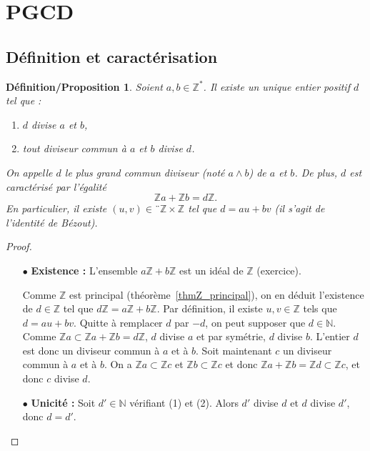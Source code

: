 \documentclass[10pt,a4paper]{report}
\newtheorem{Def/prop}[thm]{Définition/Proposition}
\newcommand{\N}{\mathbb{N}}
\newcommand{\Z}{\mathbb{Z}}
\begin{document}
\section{PGCD}

\subsection{Définition et caractérisation}

\begin{Def/prop}\label{def_prop_PGCD}
Soient $a,b \in \mathbb{Z}^*$.  Il existe un unique entier positif $d$ tel que : \begin{enumerate}
\item $d$ divise $a$ et $b$,

\item tout diviseur commun à $a$ et $b$ divise $d$.
\end{enumerate} On appelle  $d$ le plus grand commun diviseur (noté $a\wedge b$) de $a$ et $b$. De plus, $d$ est caractérisé par l'égalité  \[\Z a +\Z b=d\Z.\] En particulier, il existe $(u,v)\in¨ \Z\times \Z$ tel que $d=au+bv$ (il s'agit de l'identité de Bézout).
\end{Def/prop}

\begin{proof}
\begin{itemize}
\item[$\bullet$]\textbf{Existence :} L'ensemble $a \mathbb{Z}+b \mathbb{Z}$ est un idéal de $\mathbb{Z}$ (exercice).\par 
Comme $\Z$ est principal (théorème~\ref{thmZ_principal}), on en déduit l'existence de $d\in \Z$ tel que $d\Z=a\Z+b\Z$. Par définition, il existe $u,v\in \Z$ tels que $d=au+bv$. Quitte à remplacer $d$ par $-d$, on peut supposer que $d\in \N$. Comme $\Z a\subset \Z a+\Z b=d\Z$, $d$ divise $a$ et par symétrie, $d$ divise $b$. L'entier $d$ est donc un diviseur commun à $a$ et à $b$. Soit maintenant $c$ un diviseur commun à $a$ et à $b$. On a $\Z a\subset \Z c$ et $\Z b\subset \Z c$ et donc $\Z a +\Z b=\Z d\subset \Z c$, et donc $c$ divise $d$.

\item[$\bullet$]\textbf{Unicité :} Soit $d'\in \N$ vérifiant (1) et (2). Alors $d'$ divise $d$ et $d$ divise $d'$, donc $d=d'$.
\end{itemize}

\end{proof}
\end{document}
